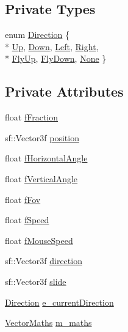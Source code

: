 \subsection*{Private Types}
\begin{DoxyCompactItemize}
\item 
enum \hyperlink{class_camera_a80cb65605322d27ad3b6d973484509ec}{Direction} \{ \\*
\hyperlink{class_camera_a80cb65605322d27ad3b6d973484509ecabbe3f3250295458287d080a1bd22836a}{Up}, 
\hyperlink{class_camera_a80cb65605322d27ad3b6d973484509eca9f55780b3556dc9a198ca80fe11e26fa}{Down}, 
\hyperlink{class_camera_a80cb65605322d27ad3b6d973484509eca078c43b15f9bbb911f662106bbf292a8}{Left}, 
\hyperlink{class_camera_a80cb65605322d27ad3b6d973484509eca75a19c746d87ee2091237f031dd8ad0c}{Right}, 
\\*
\hyperlink{class_camera_a80cb65605322d27ad3b6d973484509ecadaa005f6e4daa20b11e955258d295365}{Fly\+Up}, 
\hyperlink{class_camera_a80cb65605322d27ad3b6d973484509ecae3ff7ee5ba825d57db07cd92e2023a16}{Fly\+Down}, 
\hyperlink{class_camera_a80cb65605322d27ad3b6d973484509ecaada69810ee243aebf719c5b2e9982c11}{None}
 \}
\end{DoxyCompactItemize}
\subsection*{Private Attributes}
\begin{DoxyCompactItemize}
\item 
float \hyperlink{class_camera_a74b69f00fa9be5cfcc62df59fdbb9b8b}{f\+Fraction}
\item 
sf\+::\+Vector3f \hyperlink{class_camera_a7a74f182c7bf64bb7e3238a38a251156}{position}
\item 
float \hyperlink{class_camera_a3a8aadb8799bae49c8ddbe18ffd18844}{f\+Horizontal\+Angle}
\item 
float \hyperlink{class_camera_ada1359a4c866f93aa97fb663db45bb69}{f\+Vertical\+Angle}
\item 
float \hyperlink{class_camera_a8038d7c06da7d521ae843631efb69598}{f\+Fov}
\item 
float \hyperlink{class_camera_aeb8498caa945fa6f40756ef523b2ee14}{f\+Speed}
\item 
float \hyperlink{class_camera_a450d3b9ceabac106ea9703e5b5cd3738}{f\+Mouse\+Speed}
\item 
sf\+::\+Vector3f \hyperlink{class_camera_a97ef59710eec2c701e285d1b8e9d5adf}{direction}
\item 
sf\+::\+Vector3f \hyperlink{class_camera_a0ecb048ae43024cfda52267918e6c87e}{slide}
\item 
\hyperlink{class_camera_a80cb65605322d27ad3b6d973484509ec}{Direction} \hyperlink{class_camera_a39326efe4367d5e4260ae9316240e9b2}{e\+\_\+current\+Direction}
\item 
\hyperlink{class_vector_maths}{Vector\+Maths} \hyperlink{class_camera_a12c980cdff20aedc0f6ac08b985757aa}{m\+\_\+maths}
\end{DoxyCompactItemize}


